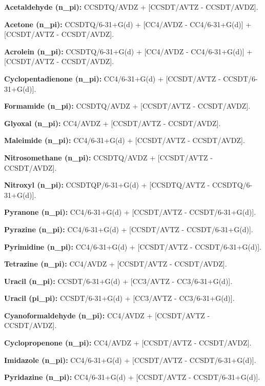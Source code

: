\noindent\textbf{Acetaldehyde (n\_pi):} CCSDTQ/AVDZ + [CCSDT/AVTZ - CCSDT/AVDZ].

\noindent\textbf{Acetone (n\_pi):} CCSDTQ/6-31+G(d) + [CC4/AVDZ - CC4/6-31+G(d)] + [CCSDT/AVTZ - CCSDT/AVDZ].

\noindent\textbf{Acrolein (n\_pi):} CCSDTQ/6-31+G(d) + [CC4/AVDZ - CC4/6-31+G(d)] + [CCSDT/AVTZ - CCSDT/AVDZ].

\noindent\textbf{Cyclopentadienone (n\_pi):} CC4/6-31+G(d) + [CCSDT/AVTZ - CCSDT/6-31+G(d)].

\noindent\textbf{Formamide (n\_pi):} CCSDTQ/AVDZ + [CCSDT/AVTZ - CCSDT/AVDZ].

\noindent\textbf{Glyoxal (n\_pi):} CC4/AVDZ + [CCSDT/AVTZ - CCSDT/AVDZ].

\noindent\textbf{Maleimide (n\_pi):} CC4/6-31+G(d) + [CCSDT/AVTZ - CCSDT/AVDZ].

\noindent\textbf{Nitrosomethane (n\_pi):} CCSDTQ/AVDZ + [CCSDT/AVTZ - CCSDT/AVDZ].

\noindent\textbf{Nitroxyl (n\_pi):} CCSDTQP/6-31+G(d) + [CCSDTQ/AVTZ - CCSDTQ/6-31+G(d)].

\noindent\textbf{Pyranone (n\_pi):} CC4/6-31+G(d) + [CCSDT/AVTZ - CCSDT/6-31+G(d)].

\noindent\textbf{Pyrazine (n\_pi):} CC4/6-31+G(d) + [CCSDT/AVTZ - CCSDT/6-31+G(d)].

\noindent\textbf{Pyrimidine (n\_pi):} CC4/6-31+G(d) + [CCSDT/AVTZ - CCSDT/6-31+G(d)].

\noindent\textbf{Tetrazine (n\_pi):} CC4/AVDZ + [CCSDT/AVTZ - CCSDT/AVDZ].

\noindent\textbf{Uracil (n\_pi):} CCSDT/6-31+G(d) + [CC3/AVTZ - CC3/6-31+G(d)].

\noindent\textbf{Uracil (pi\_pi):} CCSDT/6-31+G(d) + [CC3/AVTZ - CC3/6-31+G(d)].

\noindent\textbf{Cyanoformaldehyde (n\_pi):} CC4/AVDZ + [CCSDT/AVTZ - CCSDT/AVDZ].

\noindent\textbf{Cyclopropenone (n\_pi):} CC4/AVDZ + [CCSDT/AVTZ - CCSDT/AVDZ].

\noindent\textbf{Imidazole (n\_pi):} CC4/6-31+G(d) + [CCSDT/AVTZ - CCSDT/6-31+G(d)].

\noindent\textbf{Pyridazine (n\_pi):} CC4/6-31+G(d) + [CCSDT/AVTZ - CCSDT/6-31+G(d)].
